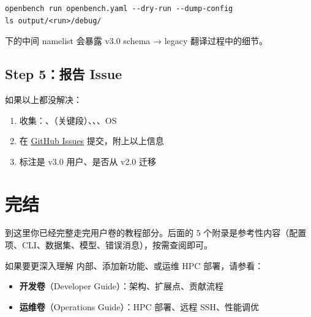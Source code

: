 \begin{verbatim}
openbench run openbench.yaml --dry-run --dump-config
ls output/<run>/debug/
\end{verbatim}

 下的中间 namelist 会暴露 v3.0 schema → legacy 翻译过程中的细节。

\subsection{Step 5：报告 Issue}

如果以上都没解决：

\begin{enumerate}
  \item 收集：、（关键段）、、、OS
  \item 在 \href{https://github.com/CoLM-SYSU/OpenBench/issues}{GitHub Issues} 提交，附上以上信息
  \item 标注是 v3.0 用户、是否从 v2.0 迁移
\end{enumerate}

\section{完结}

到这里你已经完整走完用户卷的教程部分。后面的 5 个附录是参考性内容（配置项、CLI、数据集、模型、错误消息），按需查阅即可。

如果要更深入理解 \openbench{} 内部、添加新功能、或运维 HPC 部署，请参看：

\begin{itemize}
  \item \textbf{开发卷}（Developer Guide）：架构、扩展点、贡献流程
  \item \textbf{运维卷}（Operations Guide）：HPC 部署、远程 SSH、性能调优
\end{itemize}
